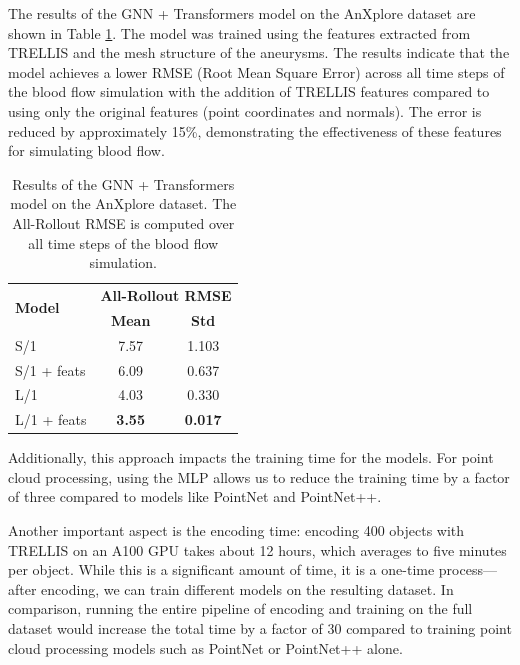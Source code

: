 \documentclass[%
 reprint,
 amsmath,amssymb,
 aps,
 floatfix,
 nofootinbib,
]{revtex4-2}
\begin{document}
The results of the GNN + Transformers model \citep{graphphysics} on the AnXplore dataset \citep{anxplore} are shown in Table \ref{tab:gnn_results}. The model was trained using the features extracted from TRELLIS \citep{xiang2024structured} and the mesh structure of the aneurysms. The results indicate that the model achieves a lower RMSE (Root Mean Square Error) across all time steps of the blood flow simulation with the addition of TRELLIS features compared to using only the original features (point coordinates and normals). The error is reduced by approximately 15\%, demonstrating the effectiveness of these features for simulating blood flow.

\begin{table}[h]
  \centering
  \setlength{\tabcolsep}{1.06em} %
  \renewcommand{\arraystretch}{1.12} %
  \begin{tabular}{lcc}
  \toprule
  \multirow{2}{*}{\textbf{Model}} & \multicolumn{2}{c}{\textbf{All-Rollout RMSE}} \\
  \cmidrule(lr){2-3}
  & \textbf{Mean} & \textbf{Std} \\
  \midrule
 S/1 & 7.57 & 1.103 \\
  \midrule
 S/1 + feats & 6.09 & 0.637 \\
  \midrule
 L/1 & 4.03 & 0.330 \\
  \midrule
 L/1 + feats & \textbf{3.55} & \textbf{0.017} \\
  \bottomrule
  \end{tabular}
  \caption{Results of the GNN + Transformers model on the AnXplore dataset. The All-Rollout RMSE is computed over all time steps of the blood flow simulation.}
  \label{tab:gnn_results}
\end{table}


Additionally, this approach impacts the training time for the models. For point cloud processing, using the MLP allows us to reduce the training time by a factor of three compared to models like PointNet and PointNet++.

Another important aspect is the encoding time: encoding 400 objects with TRELLIS on an A100 GPU takes about 12 hours, which averages to five minutes per object. While this is a significant amount of time, it is a one-time process—after encoding, we can train different models on the resulting dataset. In comparison, running the entire pipeline of encoding and training on the full dataset would increase the total time by a factor of 30 compared to training point cloud processing models such as PointNet or PointNet++ alone.
\end{document}
